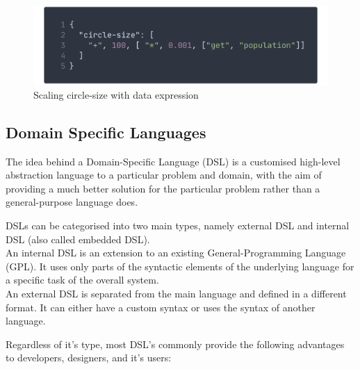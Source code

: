\documentclass[conference]{IEEEtran}
\begin{document}
\begin{figure}
    \centering
    \includegraphics[width=\columnwidth]{img/circlesize.png}
    \caption{Scaling circle-size with data expression}
    \label{fig:exp1}
\end{figure}





\subsection{Domain Specific Languages}

The idea behind a Domain-Specific Language (DSL) is a customised high-level abstraction language to a particular problem and domain, with the aim of providing a much better solution for the particular problem rather than a general-purpose language does\cite{van2000domain}.


DSLs can be categorised into two main types, namely  external DSL and internal DSL (also called embedded DSL).  
\\
An internal DSL is an extension to an existing General-Programming Language (GPL). It uses only parts of the syntactic elements
of the underlying language for a specific task of the overall system\cite{fowler2010domain}. 
\\
An external DSL is separated from the main language and defined in a different format. It can either have a custom syntax or uses the syntax of another language\cite{zdun2010dsl}.

Regardless of it's type, most DSL's commonly provide the following advantages to developers, designers, and it's users:
\end{document}
